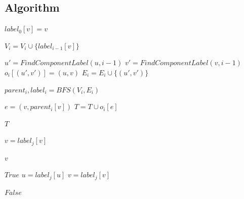 \documentclass{article}
\begin{document}
    \subsection*{Algorithm}
        \begin{algorithm}[H]
            \begin{algorithmic}
                        \State $label_0[v] = v$
                    \EndFor

                            \State $V_i = V_i \cup \{label_{i-1}[v]\}$
                        \EndFor

                                \State $u' = FindComponentLabel(u, i-1)$
                                \State $v' = FindComponentLabel(v, i-1)$
                                \State $o_i[(u', v')] = (u, v)$
                                \State $E_i = E_i \cup \{(u', v')\}$
                            \EndIf
                        \EndFor

                        \State $parent_i, label_i = BFS(V_i, E_i)$

                                \State $e = (v, parent_i[v])$
                                \State $T = T \cup o_i[e]$
                            \EndIf
                        \EndFor
                    \EndFor

                    \State \Return $T$
                \EndProcedure

                        \State $v = label_j[v]$
                    \EndFor

                    \State \Return $v$
                \EndProcedure

                            \State \Return $True$
                        \EndIf
                        \State $u = label_j[u]$
                        \State $v = label_j[v]$
                    \EndFor

                    \State \Return $False$
                \EndProcedure


\end{algorithmic}
\end{algorithm}
\end{document}

